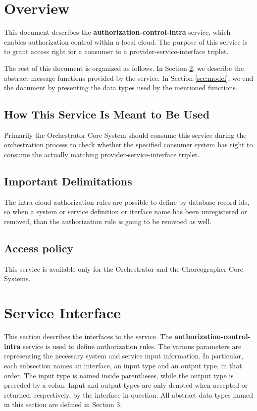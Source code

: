 \documentclass[a4paper]{arrowhead}
\begin{document}
\section{Overview}
\label{sec:overview}
This document describes the \textbf{authorization-control-intra} service, which enables authorization control within a local cloud. The purpose of this service is to grant access right for a consumer to a provider-service-interface triplet.

The rest of this document is organized as follows.
In Section \ref{sec:functions}, we describe the abstract message functions provided by the service.
In Section \ref{sec:model}, we end the document by presenting the data types used by the mentioned functions.

\newpage

\subsection{How This Service Is Meant to Be Used}
Primarily the Orchestrator Core System should consume this service during the orchestration process to check whether the specified consumer system has right to consume the actually matching provider-service-interface triplet. 

\subsection{Important Delimitations}
\label{sec:delimitations}

The intra-cloud authorization rules are possible to define by database record ids, so when a system or  service definition or iterface name has been unregistered or removed, than the authorization rule is going to be remvoed as well.

\subsection{Access policy}
\label{sec:accesspolicy}

This service is available only for the Orchestrator and the Choreographer Core Systems.

\newpage

\section{Service Interface}
\label{sec:functions}

This section describes the interfaces to the service. The \textbf{authorization-control-intra} service is used to define authorization rules. The various parameters are representing the necessary system and service input information.
In particular, each subsection names an interface, an input type and an output type, in that order.
The input type is named inside parentheses, while the output type is preceded by a colon.
Input and output types are only denoted when accepted or returned, respectively, by the interface in question. All abstract data types named in this section are defined in Section 3.
\end{document}
